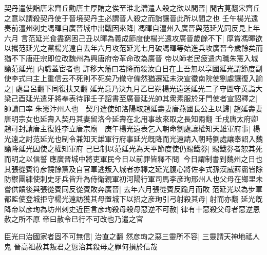 契丹遣使詣唐宋齊丘勸唐主厚賄之俟至淮北濳遣人殺之欲以間晉|{
	間古莧翻宋齊丘之意以謂殺契丹使于晉境契丹主必謂晉人殺之而誚讓晉此所以間之也}
壬午楊光遠奏前澶州刺史馮暉自廣晉城中出戰因來降|{
	馮暉自澶州入廣晉與范延光同反見上年六月}
言范延光食盡窮困己丑以暉為義成節度使楊光遠攻廣晉歲餘不下|{
	厚賞馮暉欲以攜范延光之黨楊光遠自去年六月攻范延光七月破馮暉等始進兵攻廣晉今歲餘矣而猶不下唐莊宗即位改魏州為興唐府帝革命改為廣晉}
帝以師老民疲遣内職朱憲入城諭范延光|{
	内職蓋宦者也}
許移大藩曰若降而殺汝白日在上吾無以享國延光謂節度副使李式曰主上重信云不死則不死矣乃撤守備然猶遷延未決宣徽南院使劉處讓復入諭之|{
	處昌呂翻下同復扶又翻}
延光意乃決九月乙巳朔楊光遠送延光二子守圖守英詣大梁己酉延光遣牙將奉表待罪壬子詔書至廣晉延光帥其衆素服於牙門使者宣詔釋之|{
	帥讀曰率}
朱憲汴州人也　契丹遣使如洛陽取趙延壽妻唐燕國長公主以歸|{
	趙延壽妻唐明宗女也延壽入契丹其妻留洛今延壽在北用事故來取之長知兩翻}
壬戌唐太府卿趙可封請唐主復姓李立唐宗廟　庚午楊光遠表乞入朝命劉處讓權知天雄軍府事|{
	楊光遠之討范延光也制令兼知天雄軍行府事延光旣降而光遠請入朝時劉處讓奉詔入魏諭降延光因使之權知軍府}
己巳制以范延光為天平節度使仍賜鐵劵|{
	賜鐵劵者恕其死而明之以信誓}
應廣晉城中將吏軍民今日以前罪皆釋不問|{
	今日謂制書到魏州之日也}
其張從賓符彦饒餘黨及自官軍逃叛入城者亦釋之延光腹心將佐李式孫漢威薛霸皆除防禦團練使刺史牙兵皆升為侍衛親軍初河陽行軍司馬李彦珣邢州人也父母在鄉里未嘗供饋後與張從賓同反從賓敗奔廣晉|{
	去年六月張從賓反踰月而敗}
范延光以為步軍都監使登城拒守楊光遠訪獲其母置城下以招之彦珣引弓射殺其母|{
	射而亦翻}
延光旣降帝以彦珣為坊州刺史近臣言彦珣殺母殺母惡逆不可赦|{
	律有十惡殺父母者惡逆恩赦之所不原}
帝曰赦令已行不可改也乃遣之官

臣光曰治國家者固不可無信|{
	治直之翻}
然彦珣之惡三靈所不容|{
	三靈謂天神地祗人鬼}
晉高祖赦其叛君之愆治其殺母之罪何損於信哉

